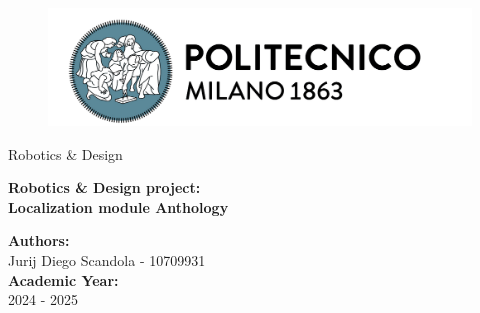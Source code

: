 \begin{titlepage}
   \begin{center}
       
       \begin{figure}[h]
       \begin{center}
           \includegraphics[width=0.9\linewidth]{photos/polimiLogo.png}
                  \end{center}
       \end{figure}

       \begin{center}
           Robotics \& Design
       \end{center}

       \vspace{2cm}

       \textbf{\Large Robotics \& Design project:\\ 
       Localization module Anthology \\}

       \vspace{6cm}
       
       \begin{flushleft}
           \textbf{Authors: } \\
           Jurij Diego Scandola - 10709931 \\
           \vspace{1cm}
           \textbf{Academic Year: } \\
            2024 - 2025 \\
       \end{flushleft}
   \end{center}


\end{titlepage}

